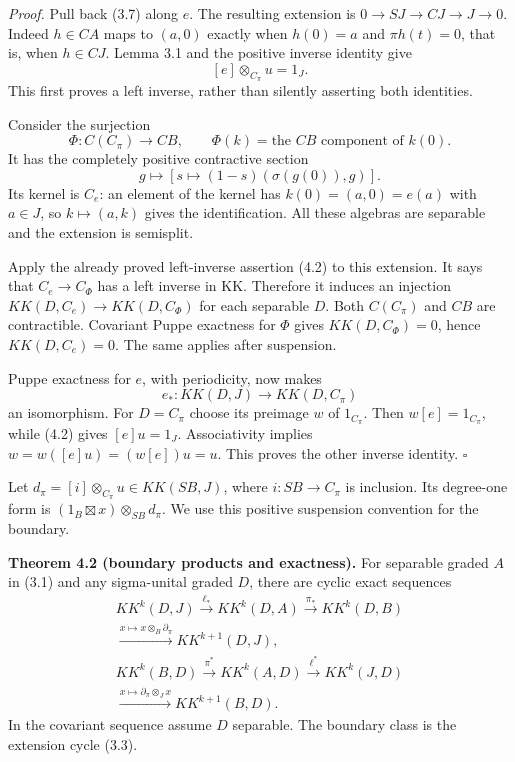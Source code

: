 \documentclass[
  11pt,
]{article}
\begin{document}
\emph{Proof.} Pull back (3.7) along \(e\). The resulting extension is
\(0\to SJ\to CJ\to J\to0\). Indeed \(h\in CA\) maps to \((a,0)\) exactly
when \(h(0)=a\) and \(\pi h(t)=0\), that is, when \(h\in CJ\). Lemma 3.1
and the positive inverse identity give \[
[e]\otimes_{C_\pi}u=1_J.
\tag{4.2}
\] This first proves a left inverse, rather than silently asserting both
identities.

Consider the surjection \[
\Phi:C(C_\pi)\longrightarrow CB,\qquad
\Phi(k)=\text{the }CB\text{ component of }k(0).
\tag{4.3}
\] It has the completely positive contractive section \[
g\longmapsto
\left[s\longmapsto(1-s)(\sigma(g(0)),g)\right].
\tag{4.4}
\] Its kernel is \(C_e\): an element of the kernel has
\(k(0)=(a,0)=e(a)\) with \(a\in J\), so \(k\mapsto(a,k)\) gives the
identification. All these algebras are separable and the extension is
semisplit.

Apply the already proved left-inverse assertion (4.2) to this extension.
It says that \(C_e\to C_\Phi\) has a left inverse in KK. Therefore it
induces an injection \(KK(D,C_e)\to KK(D,C_\Phi)\) for each separable
\(D\). Both \(C(C_\pi)\) and \(CB\) are contractible. Covariant Puppe
exactness for \(\Phi\) gives \(KK(D,C_\Phi)=0\), hence \(KK(D,C_e)=0\).
The same applies after suspension.

Puppe exactness for \(e\), with periodicity, now makes \[
e_*:KK(D,J)\longrightarrow KK(D,C_\pi)
\tag{4.5}
\] an isomorphism. For \(D=C_\pi\) choose its preimage \(w\) of
\(1_{C_\pi}\). Then \(w[e]=1_{C_\pi}\), while (4.2) gives \([e]u=1_J\).
Associativity implies \(w=w([e]u)=(w[e])u=u\). This proves the other
inverse identity. \(\square\)

Let \(d_\pi=[i]\otimes_{C_\pi}u\in KK(SB,J)\), where \(i:SB\to C_\pi\)
is inclusion. Its degree-one form is
\((1_B\boxtimes x)\otimes_{SB}d_\pi\). We use this positive suspension
convention for the boundary.

\textbf{Theorem 4.2 (boundary products and exactness).} For separable
graded \(A\) in (3.1) and any sigma-unital graded \(D\), there are
cyclic exact sequences \[
\begin{gathered}
KK^k(D,J)\xrightarrow{\ell_*}KK^k(D,A)
\xrightarrow{\pi_*}KK^k(D,B)\\
\xrightarrow{x\mapsto x\otimes_B\partial_\pi}KK^{k+1}(D,J),\\[2pt]
KK^k(B,D)\xrightarrow{\pi^*}KK^k(A,D)
\xrightarrow{\ell^*}KK^k(J,D)\\
\xrightarrow{x\mapsto\partial_\pi\otimes_J x}KK^{k+1}(B,D).
\end{gathered}
\tag{4.6}
\] In the covariant sequence assume \(D\) separable. The boundary class
is the extension cycle (3.3).
\end{document}
